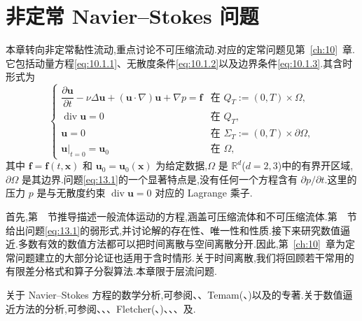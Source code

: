 \chapter{非定常 Navier--Stokes 问题}\label{ch:13}

本章转向非定常黏性流动,重点讨论不可压缩流动.对应的定常问题见第~\ref{ch:10}~章.
它包括动量方程\eqref{eq:10.1.1}、\allowbreak 无散度条件\eqref{eq:10.1.2}以及边界条件\eqref{eq:10.1.3}.其含时形式为
\begin{equation}\tag{13.1}\label{eq:13.1}
  \begin{cases}
    \dfrac{\partial\boldsymbol{u}}{\partial t}-\nu\Delta\boldsymbol{u}
      +(\boldsymbol{u}\cdot\nabla)\boldsymbol{u}+\nabla p=\boldsymbol{f}
       & \text{在 }Q_T:=(0,T)\times\Omega,\\[2pt]
    \operatorname{div}\boldsymbol{u}=0 & \text{在 }Q_T,\\
    \boldsymbol{u}=0 & \text{在 }\Sigma_T:=(0,T)\times\partial\Omega,\\
    \boldsymbol{u}|_{t=0}=\boldsymbol{u}_0 & \text{在 }\Omega,
  \end{cases}
\end{equation}
其中 \(\boldsymbol{f}=\boldsymbol{f}(t,\boldsymbol{x})\) 和 \(\boldsymbol{u}_0=\boldsymbol{u}_0(\boldsymbol{x})\) 为给定数据,\(\Omega\) 是 \(\mathbb R^d\)(\(d=2,3\))中的有界开区域,\(\partial\Omega\) 是其边界.问题\eqref{eq:13.1}的一个显著特点是,没有任何一个方程含有 \(\partial p/\partial t\).这里的压力 \(p\) 是与无散度约束 \(\operatorname{div}\boldsymbol{u}=0\) 对应的 Lagrange 乘子.

首先,第~~节推导描述一般流体运动的方程,涵盖可压缩流体和不可压缩流体.第~~节给出问题\eqref{eq:13.1}的弱形式,并讨论解的存在性、唯一性和性质.接下来研究数值逼近.多数有效的数值方法都可以把时间离散与空间离散分开.因此,第~\ref{ch:10}~章为定常问题建立的大部分论证也适用于含时情形.关于时间离散,我们将回顾若干常用的有限差分格式和算子分裂算法.本章限于层流问题.

关于 Navier--Stokes 方程的数学分析,可参阅、、Temam(、)以及的专著.关于数值逼近方法的分析,可参阅、、、Fletcher(、)、、、及.

